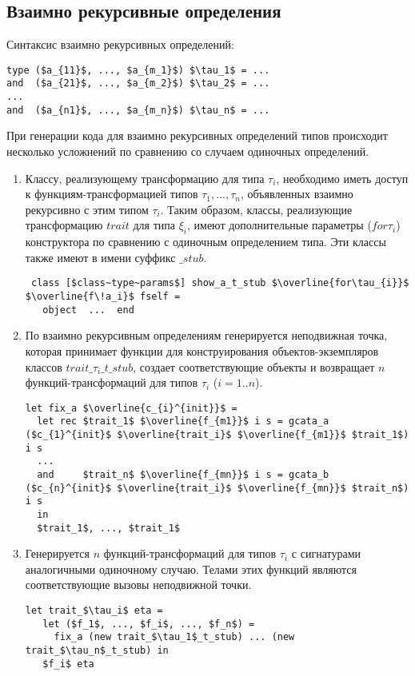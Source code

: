 \documentclass[acmsmall,review,anonymous]{acmart}\settopmatter{printfolios=true,printccs=false,printacmref=false}
\begin{document}
\subsection{Взаимно рекурсивные определения}

Синтаксис взаимно рекурсивных определений:
\begin{lstlisting}
type ($a_{11}$, ..., $a_{m_1}$) $\tau_1$ = ... 
and  ($a_{21}$, ..., $a_{m_2}$) $\tau_2$ = ... 
...
and  ($a_{n1}$, ..., $a_{m_n}$) $\tau_n$ = ...
\end{lstlisting}

При генерации кода для взаимно рекурсивных определений типов происходит несколько усложнений по сравнению со случаем одиночных определений.

\begin{enumerate}
 \item Классу, реализующему трансформацию для типа $\tau_i$, необходимо иметь доступ к функциям-трансформацией типов $\tau_1,...,\tau_n$, объявленных взаимно рекурсивно с этим типом $\tau_i$. Таким образом, классы, реализующие трансформацию $trait$ для типа $\xi_i$, имеют дополнительные параметры ($f\!or\tau_{i}$) конструктора по сравнению с одиночным определением типа. Эти классы также имеют в имени суффикс $\_stub$.
 \begin{lstlisting}
 class [$class~type~params$] show_a_t_stub $\overline{for\tau_{i}}$ $\overline{f\!a_i}$ fself = 
   object  ...  end
\end{lstlisting}

 \item По взаимно рекурсивным определениям генерируется неподвижная точка, которая принимает функции для конструирования объектов-экземпляров классов $trait\_\tau_i\_t\_stub$, создает соответствующие объекты и возвращает $n$ функций-трансформаций для типов $\tau_i$ ($i=1..n$).

\begin{lstlisting}
let fix_a $\overline{c_{i}^{init}}$ =
  let rec $trait_1$ $\overline{f_{m1}}$ i s = gcata_a ($c_{1}^{init}$ $\overline{trait_i}$ $\overline{f_{m1}}$ $trait_1$) i s
  ...
  and     $trait_n$ $\overline{f_{mn}}$ i s = gcata_b ($c_{n}^{init}$ $\overline{trait_i}$ $\overline{f_{mn}}$ $trait_n$) i s 
  in
  $trait_1$, ..., $trait_1$
\end{lstlisting}
 
 \item Генерируется $n$ функций-трансформаций для типов $\tau_i$ с сигнатурами аналогичными одиночному случаю. Телами этих функций являются соответствующие вызовы неподвижной точки.
\begin{lstlisting}
let trait_$\tau_i$ eta = 
   let ($f_1$, ..., $f_i$, ..., $f_n$) = 
     fix_a (new trait_$\tau_1$_t_stub) ... (new trait_$\tau_n$_t_stub) in
   $f_i$ eta
\end{lstlisting} 


\end{enumerate}
\end{document}
